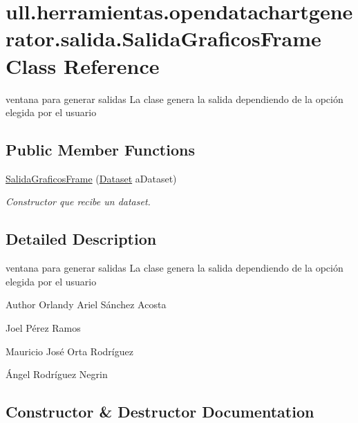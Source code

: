 \hypertarget{classull_1_1herramientas_1_1opendatachartgenerator_1_1salida_1_1_salida_graficos_frame}{}\section{ull.\+herramientas.\+opendatachartgenerator.\+salida.\+Salida\+Graficos\+Frame Class Reference}
\label{classull_1_1herramientas_1_1opendatachartgenerator_1_1salida_1_1_salida_graficos_frame}


ventana para generar salidas La clase genera la salida dependiendo de la opción elegida por el usuario  


\subsection*{Public Member Functions}
\begin{DoxyCompactItemize}
\item 
\mbox{\hyperlink{classull_1_1herramientas_1_1opendatachartgenerator_1_1salida_1_1_salida_graficos_frame_af8b76d5c30df7aa254daff0d2d3f5855}{Salida\+Graficos\+Frame}} (\mbox{\hyperlink{classull_1_1herramientas_1_1opendatachartgenerator_1_1_dataset}{Dataset}} a\+Dataset)
\begin{DoxyCompactList}\small\item\em Constructor que recibe un dataset. \end{DoxyCompactList}\end{DoxyCompactItemize}


\subsection{Detailed Description}
ventana para generar salidas La clase genera la salida dependiendo de la opción elegida por el usuario 

\begin{DoxyAuthor}{Author}
Orlandy Ariel Sánchez Acosta 

Joel Pérez Ramos 

Mauricio José Orta Rodríguez 

Ángel Rodríguez Negrin 
\end{DoxyAuthor}


\subsection{Constructor \& Destructor Documentation}
\mbox{\label{classull_1_1herramientas_1_1opendatachartgenerator_1_1salida_1_1_salida_graficos_frame_af8b76d5c30df7aa254daff0d2d3f5855}} 
